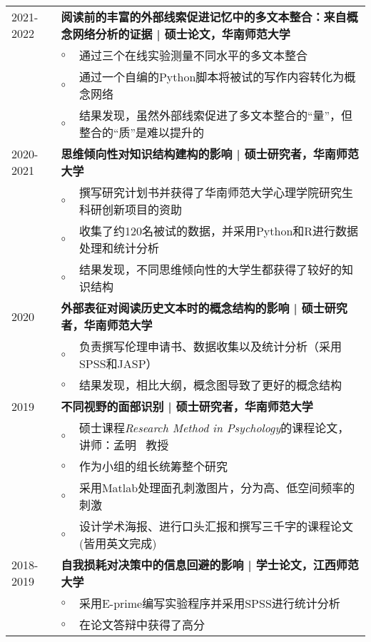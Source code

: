 \documentclass[a4paper, 12pt]{ctexart}
\begin{document}
\begin{tabularx}{\textwidth}{p{2cm} p{0.1cm} X}

    2021-2022 & \multicolumn{2}{X}{\textbf{阅读前的丰富的外部线索促进记忆中的多文本整合：来自概念网络分析的证据 | 硕士论文，华南师范大学}} \\
    & $\circ$ & 通过三个在线实验测量不同水平的多文本整合 \\
    & $\circ$ & 通过一个自编的Python脚本将被试的写作内容转化为概念网络\\
    & $\circ$ & 结果发现，虽然外部线索促进了多文本整合的“量”，但整合的“质”是难以提升的 \\

    2020-2021 & \multicolumn{2}{X}{\textbf{思维倾向性对知识结构建构的影响 | 硕士研究者，华南师范大学}} \\
    & $\circ$ & 撰写研究计划书并获得了华南师范大学心理学院研究生科研创新项目的资助 \\
    & $\circ$ & 收集了约120名被试的数据，并采用Python和R进行数据处理和统计分析  \\
    & $\circ$ &  结果发现，不同思维倾向性的大学生都获得了较好的知识结构 \\
    
    2020 & \multicolumn{2}{X}{\textbf{外部表征对阅读历史文本时的概念结构的影响 | 硕士研究者，华南师范大学}} \\
    & $\circ$ & 负责撰写伦理申请书、数据收集以及统计分析（采用SPSS和JASP） \\
    & $\circ$ & 结果发现，相比大纲，概念图导致了更好的概念结构 \\

    2019 & \multicolumn{2}{X}{\textbf{不同视野的面部识别 | 硕士研究者，华南师范大学}} \\
    & $\circ$ & 硕士课程\textit{Research Method in Psychology}的课程论文，讲师：孟明 \ 教授 \\ 
    & $\circ$ & 作为小组的组长统筹整个研究 \\
    & $\circ$ & 采用Matlab处理面孔刺激图片，分为高、低空间频率的刺激 \\
    & $\circ$ & 设计学术海报、进行口头汇报和撰写三千字的课程论文 (皆用英文完成) \\
    

    2018-2019 & \multicolumn{2}{X}{\textbf{自我损耗对决策中的信息回避的影响 | 学士论文，江西师范大学}} \\
    & $\circ$ & 采用E-prime编写实验程序并采用SPSS进行统计分析 \\
    & $\circ$ & 在论文答辩中获得了高分 \\

    \end{tabularx}
\end{document}
